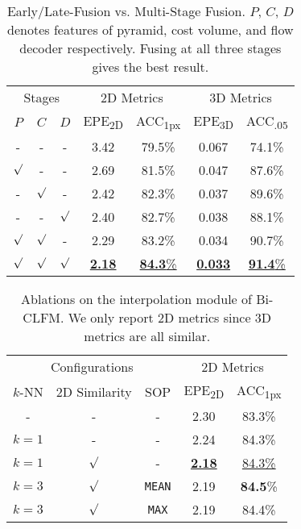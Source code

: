 \documentclass[10pt,twocolumn,letterpaper]{article}
\begin{document}
\begin{table}[t]
    \centering
    \begin{tabular}{ccc|cc|cc}
    \hline
    \multicolumn{3}{c|}{Stages} & \multicolumn{2}{c|}{2D Metrics} & \multicolumn{2}{c}{3D Metrics} \\
    $P$ & $C$ & $D$ & EPE\textsubscript{2D} & ACC\textsubscript{1px} & EPE\textsubscript{3D} & ACC\textsubscript{.05} \\
    \hline
    - & - & -                   & 3.42 & 79.5\% & 0.067 & 74.1\% \\
    $\surd$ & - & -             & 2.69 & 81.5\% & 0.047 & 87.6\% \\
    - & $\surd$ & -             & 2.42 & 82.3\% & 0.037 & 89.6\% \\
    - & - & $\surd$             & 2.40 & 82.7\% & 0.038 & 88.1\% \\
    $\surd$ & $\surd$ & -       & 2.29 & 83.2\% & 0.034 & 90.7\% \\
    $\surd$ & $\surd$ & $\surd$ & \underline{\textbf{2.18}} & \underline{\textbf{84.3}\%} & \underline{\textbf{0.033}} & \underline{\textbf{91.4}\%} \\
    \hline
    \end{tabular}
    \vspace{-5pt}
    \caption{Early/Late-Fusion vs. Multi-Stage Fusion. $P$, $C$, $D$ denotes features of pyramid, cost volume, and flow decoder respectively. Fusing at all three stages gives the best result.}
    \label{tab:ablation-multi-stage}
    \vspace{-5pt}
\end{table}

\begin{table}[t]
    \centering
    \begin{tabular}{ccc|cc}
    \hline
    \multicolumn{3}{c|}{Configurations} & \multicolumn{2}{c}{2D Metrics} \\
    $k$-NN & 2D Similarity & SOP & EPE\textsubscript{2D} & ACC\textsubscript{1px} \\
    \hline
    - & - & -                       & 2.30 & 83.3\% \\
    $k=1$ & - & -                   & 2.24 & 84.3\% \\
    $k=1$ & $\surd$ & -             & \underline{\textbf{2.18}} & \underline{84.3\%} \\
    $k=3$ & $\surd$ & \texttt{MEAN} & 2.19 & \textbf{84.5}\% \\
    $k=3$ & $\surd$ & \texttt{MAX}  & 2.19 & 84.4\% \\
    \hline
    \end{tabular}
    \vspace{-5pt}
    \caption{Ablations on the interpolation module of Bi-CLFM. We only report 2D metrics since 3D metrics are all similar.}
    \vspace{-5pt}
    \label{tab:ablation-clfm-interpolation}
\end{table}
\end{document}
